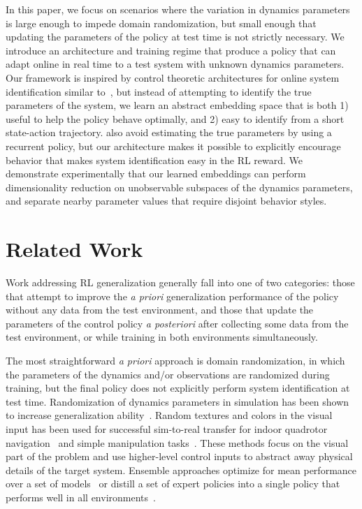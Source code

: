 \documentclass{article}
\begin{document}
In this paper, we focus on scenarios where the variation in dynamics parameters
is large enough to impede domain randomization,
but small enough that updating the parameters of the policy at test time is not strictly necessary.
We introduce an architecture and training regime that produce a policy
that can adapt online in real time to a test system with unknown dynamics parameters.
Our framework is inspired by control theoretic architectures for online system identification
similar to~\citet{yu-up-osi-rss17},
but instead of attempting to identify the true parameters of the system,
we learn an abstract embedding space that is both
1) useful to help the policy behave optimally, and
2) easy to identify from a short state-action trajectory.
\citet{peng-dynamics-randomization-corr17} also avoid estimating the true parameters by using a recurrent policy,
but our architecture makes it possible to explicitly encourage behavior that makes system identification easy
in the RL reward.
We demonstrate experimentally that our learned embeddings can perform dimensionality reduction on unobservable subspaces of the dynamics parameters,
and separate nearby parameter values that require disjoint behavior styles.

\section{Related Work}
Work addressing RL generalization generally fall into one of two categories:
those that attempt to improve the \emph{a priori} generalization performance of the policy without any data from the test environment,
and those that update the parameters of the control policy \emph{a posteriori} after collecting some data from the test environment,
or while training in both environments simultaneously.

The most straightforward \emph{a priori} approach is domain randomization,
in which the parameters of the dynamics and/or observations are randomized during training,
but the final policy does not explicitly perform system identification at test time.
%
Randomization of dynamics parameters in simulation has been shown to increase generalization ability~\citep{antonova-pivoting-corr17, zhu-RL-IL-diverse}.
Random textures and colors in the visual input has been used for successful sim-to-real transfer
for indoor quadrotor navigation~\citep{sadeghi-cad2rl-rss17}
and simple manipulation tasks~\citep{tobin-domainrand-arxiv17,james-domain-xfer}.
These methods focus on the visual part of the problem and use higher-level control inputs
to abstract away physical details of the target system.
Ensemble approaches optimize for mean performance over a set of models~\citep{mordatch-ensemble-icra15}
or distill a set of expert policies into a single policy that performs well in all environments~\citep{actor-mimic,teh-distral}.
\end{document}
